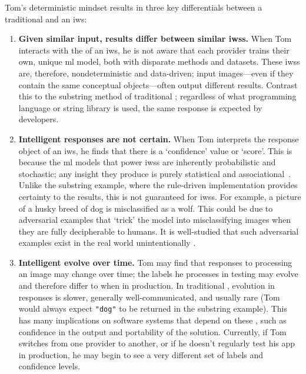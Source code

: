 Tom's deterministic mindset results in three key differentials between a traditional  and an \gls{iws}:
\begin{enumerate}[label=\textbf{(\arabic*)}]
    \item \textbf{Given similar input, results differ between similar \glspl{iws}.}
    When Tom interacts with the  of an \gls{iws}, he is not aware that each  provider trains their own, unique \gls{ml} model, both with disparate methods and datasets. These \glspl{iws} are, therefore, nondeterministic and data-driven; input images---even if they contain the same conceptual objects---often output different results. Contrast this to the substring method of traditional ; regardless of what programming language or string library is used, the same response is expected by developers.
    \item \textbf{Intelligent responses are not certain.}
    When Tom interprets the response object of an \gls{iws}, he finds that there is a `confidence' value or `score'. This is because the \gls{ml} models that power \glspl{iws} are inherently probabilistic and stochastic; any insight they produce is purely statistical and associational~\citep{Pearl:2018uv}. Unlike the substring example, where the rule-driven implementation provides certainty to the results, this is not guaranteed for \glspl{iws}.
    For example, a picture of a husky breed of dog is misclassified as a wolf. This could be due to adversarial examples \citep{Szegedy:2013vw} that `trick' the model into misclassifying images when they are fully decipherable to humans. It is well-studied that such adversarial examples exist in the real world unintentionally \citep{Kurakin:2016vw,Eykholt:2018vk,Pezzementi:2018tq}.
    \item \textbf{Intelligent  evolve over time.}
    Tom may find that responses to processing an image may change over time; the labels he processes in testing may evolve and therefore differ to when in production. In traditional , evolution in responses is slower, generally well-communicated, and usually rare (Tom would always expect \texttt{"dog"} to be returned in the substring example). This has many implications on software systems that depend on these , such as confidence in the output and portability of the solution. Currently, if Tom switches from one  provider to another, or if he doesn't regularly test his app in production, he may begin to see a very different set of labels and confidence levels.
\end{enumerate}

